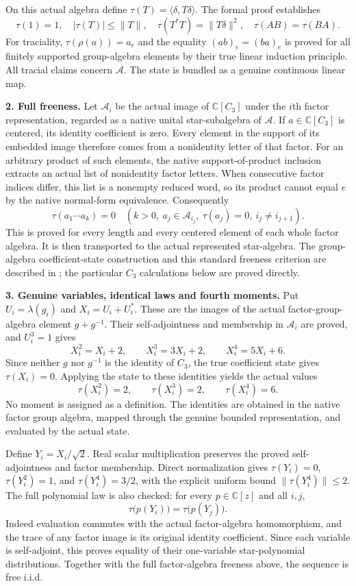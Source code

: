 \documentclass[10pt]{article}
\newcommand{\C}{\mathbb C}
\newcommand{\A}{\mathcal A}
\begin{document}
On this actual algebra define $\tau(T)=\langle\delta,T\delta\rangle$.
The formal proof establishes
\[
 \tau(1)=1,\quad |\tau(T)|\le\|T\|,\quad
 \tau(T^*T)=\|T\delta\|^2,\quad \tau(AB)=\tau(BA).
\]
For traciality, $\tau(\rho(a))=a_e$ and the equality
$(ab)_e=(ba)_e$ is proved for all finitely supported group-algebra
elements by their true linear induction principle. All tracial claims
concern $\A$. The state is bundled as a genuine continuous linear map.

\textbf{2. Full freeness.}
Let $\A_i$ be the actual image of $\C[C_3]$ under the $i$th factor
representation, regarded as a native unital star-subalgebra of $\A$.
If $a\in\C[C_3]$ is centered, its identity coefficient is zero.
Every element in the support of its embedded image therefore comes
from a nonidentity letter of that factor. For an arbitrary product of
such elements, the native support-of-product inclusion extracts an
actual list of nonidentity factor letters. When consecutive factor
indices differ, this list is a nonempty reduced word, so its product
cannot equal $e$ by the native normal-form equivalence. Consequently
\[
 \tau(a_1\cdots a_k)=0
 \quad(k>0,\ a_j\in\A_{i_j},\ \tau(a_j)=0,\ i_j\ne i_{j+1}).
\]
This is proved for every length and every centered element of each
whole factor algebra. It is then transported to the actual represented
star-algebra. The group-algebra coefficient-state construction and this
standard freeness criterion are described in \cite[pp.~339--340]{Novak};
the particular $C_3$ calculations below are proved directly.

\newpage
\textbf{3. Genuine variables, identical laws and fourth moments.}
Put $U_i=\lambda(g_i)$ and $X_i=U_i+U_i^*$. These are the images of the
actual factor-group-algebra element $g+g^{-1}$. Their self-adjointness
and membership in $\A_i$ are proved, and $U_i^3=1$ gives
\[
 X_i^2=X_i+2,\qquad X_i^3=3X_i+2,\qquad X_i^4=5X_i+6.
\]
Since neither $g$ nor $g^{-1}$ is the identity of $C_3$, the true
coefficient state gives $\tau(X_i)=0$. Applying the state to these
identities yields the actual values
\[
 \tau(X_i^2)=2,\qquad \tau(X_i^3)=2,\qquad \tau(X_i^4)=6.
\]
No moment is assigned as a definition. The identities are obtained in
the native factor group algebra, mapped through the genuine bounded
representation, and evaluated by the actual state.

Define $Y_i=X_i/\sqrt2$. Real scalar multiplication preserves the
proved self-adjointness and factor membership. Direct normalization
gives $\tau(Y_i)=0$, $\tau(Y_i^2)=1$, and $\tau(Y_i^4)=3/2$, with the
explicit uniform bound $\|\tau(Y_i^4)\|\le2$. The full polynomial law
is also checked: for every $p\in\C[z]$ and all $i,j$,
\[
 \tau\bigl(p(Y_i)\bigr)=\tau\bigl(p(Y_j)\bigr).
\]
Indeed evaluation commutes with the actual factor-algebra homomorphism,
and the trace of any factor image is its original identity coefficient.
Since each variable is self-adjoint, this proves equality of their
one-variable star-polynomial distributions. Together with the full
factor-algebra freeness above, the sequence is free i.i.d.
\end{document}
